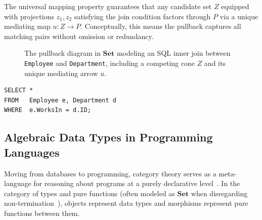 The universal mapping property guarantees that any candidate set $Z$ equipped with projections $z_1, z_2$ satisfying the join condition factors through $P$ via a unique mediating map $u \colon Z \to P$. Conceptually, this means the pullback captures all matching pairs without omission or redundancy.

\begin{figure}[tb]
  \centering
  \caption{The pullback diagram in $\mathbf{Set}$ modeling an SQL inner join between \texttt{Employee} and \texttt{Department}, including a competing cone $Z$ and its unique mediating arrow $u$.}
  \label{fig:db-pullback}
\end{figure}

\lstset{language=SQL, captionpos=b, basicstyle=\ttfamily\small, keywordstyle=\bfseries}
\begin{lstlisting}[caption={SQL inner join corresponding to the pullback in Figure~\ref{fig:db-pullback}.}, label=lst:sql-join, float=tb]
SELECT *
FROM   Employee e, Department d
WHERE  e.WorksIn = d.ID;
\end{lstlisting}

\subsection{Algebraic Data Types in Programming Languages}
\label{sec:prog-lang}

Moving from databases to programming, category theory serves as a meta-language for reasoning about programs at a purely declarative level~\cite[Ch.~11]{Milewski18}. In the category of types and pure functions (often modeled as $\mathbf{Set}$ when disregarding non-termination~\cite[Sec.~2.3]{Milewski18}), objects represent data types and morphisms represent pure functions between them.

